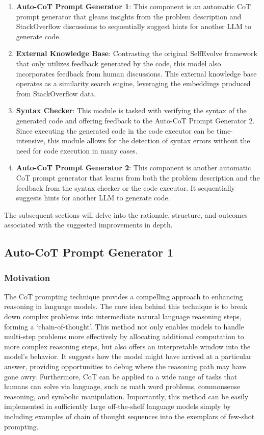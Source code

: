 \documentclass[a4paper,oneside]{book}
\begin{document}
\begin{enumerate}
  \item \textbf{Auto-CoT Prompt Generator 1}: This component is an automatic CoT prompt generator that gleans insights from the problem description and StackOverflow discussions to sequentially suggest hints for another LLM to generate code.
  \item \textbf{External Knowledge Base}: Contrasting the original SelfEvolve framework that only utilizes feedback generated by the code, this model also incorporates feedback from human discussions. This external knowledge base operates as a similarity search engine, leveraging the embeddings produced from StackOverflow data.
  \item \textbf{Syntax Checker}: This module is tasked with verifying the syntax of the generated code and offering feedback to the Auto-CoT Prompt Generator 2. Since executing the generated code in the code executor can be time-intensive, this module allows for the detection of syntax errors without the need for code execution in many cases.
  \item \textbf{Auto-CoT Prompt Generator 2}: This component is another automatic CoT prompt generator that learns from both the problem description and the feedback from the syntax checker or the code executor. It sequentially suggests hints for another LLM to generate code.
\end{enumerate}

The subsequent sections will delve into the rationale, structure, and outcomes associated with the suggested improvements in depth.

\subsection{Auto-CoT Prompt Generator 1}
\subsubsection{Motivation}
The CoT prompting technique provides a compelling approach to enhancing reasoning in language models. The core idea behind this technique is to break down complex problems into intermediate natural language reasoning steps, forming a `chain-of-thought'. This method not only enables models to handle multi-step problems more effectively by allocating additional computation to more complex reasoning steps, but also offers an interpretable window into the model's behavior. It suggests how the model might have arrived at a particular answer, providing opportunities to debug where the reasoning path may have gone awry. Furthermore, CoT can be applied to a wide range of tasks that humans can solve via language, such as math word problems, commonsense reasoning, and symbolic manipulation. Importantly, this method can be easily implemented in sufficiently large off-the-shelf language models simply by including examples of chain of thought sequences into the exemplars of few-shot prompting.
\end{document}
